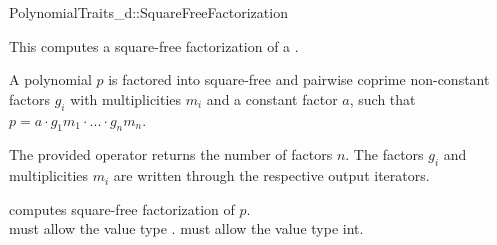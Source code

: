 \begin{ccRefConcept}{PolynomialTraits_d::SquareFreeFactorization}

\ccDefinition

This  computes a square-free factorization 
of a . 

A polynomial $p$ is factored into square-free and pairwise coprime non-constant
factors $g_i$ with multiplicities $m_i$ and a constant factor $a$, such that 
$p = a  \cdot  g_1m_1  \cdot  ...  \cdot  g_nm_n$.

The provided operator returns the number of factors $n$.
The factors $g_i$ and multiplicities $m_i$ are written through 
the respective output iterators.\\

          
\ccRefines 

\ccTypes
{}

\ccOperations

{ computes square-free factorization of $p$.\\
  \ccPrecond {} must allow the value type 
  . 
  \ccPrecond {} must allow the value type int.
}


\ccSeeAlso

\\
\\
\\
\\

\end{ccRefConcept}
